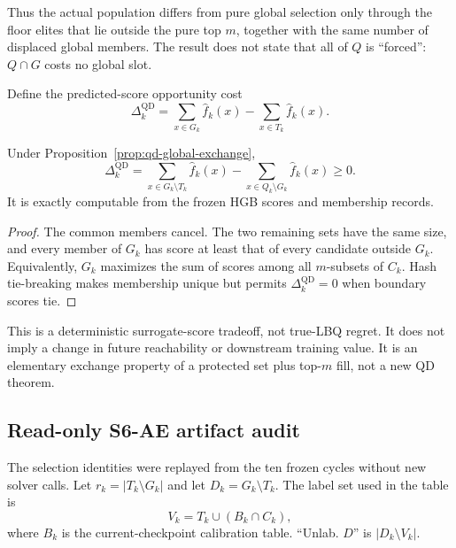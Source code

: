 Thus the actual population differs from pure global selection only through
the floor elites that lie outside the pure top $m$, together with the same
number of displaced global members.  The result does not state that all of
$Q$ is ``forced'': $Q\cap G$ costs no global slot.

Define the predicted-score opportunity cost
\[
  \Delta_k^{\mathrm{QD}}
   =\sum_{x\in G_k}\widehat f_k(x)
    -\sum_{x\in T_k}\widehat f_k(x).
\]

\begin{proposition}
\label{prop:qd-predicted-cost}
Under Proposition~\ref{prop:qd-global-exchange},
\[
  \Delta_k^{\mathrm{QD}}
  =\sum_{x\in G_k\setminus T_k}\widehat f_k(x)
   -\sum_{x\in Q_k\setminus G_k}\widehat f_k(x)
  \ge 0.
\]
It is exactly computable from the frozen HGB scores and membership records.
\end{proposition}

\begin{proof}
The common members cancel.  The two remaining sets have the same size, and
every member of $G_k$ has score at least that of every candidate outside
$G_k$.  Equivalently, $G_k$ maximizes the sum of scores among all
$m$-subsets of $C_k$.  Hash tie-breaking makes membership unique but permits
$\Delta_k^{\mathrm{QD}}=0$ when boundary scores tie.
\end{proof}

This is a deterministic surrogate-score tradeoff, not true-LBQ regret.  It
does not imply a change in future reachability or downstream training value.
It is an elementary exchange property of a protected set plus top-$m$ fill,
not a new QD theorem.

\subsection{Read-only S6-AE artifact audit}

The selection identities were replayed from the ten frozen cycles without new
solver calls.  Let $r_k=|T_k\setminus G_k|$ and let $D_k=G_k\setminus T_k$.
The label set used in the table is
\[
 V_k=T_k\cup(B_k\cap C_k),
\]
where $B_k$ is the current-checkpoint calibration table.  ``Unlab. $D$'' is
$|D_k\setminus V_k|$.

